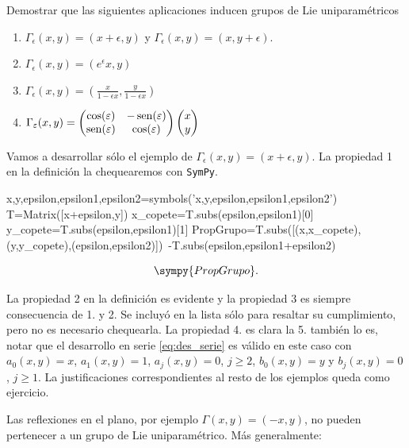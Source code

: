 \begin{ejemplo}{} Demostrar que las siguientes aplicaciones inducen grupos de Lie uniparamétricos
\begin{enumerate}
\item $\Gamma_{\epsilon}(x,y)=(x+\epsilon,y)$ y $\Gamma_{\epsilon}(x,y)=(x,y+\epsilon)$.
\item $\Gamma_{\epsilon}(x,y)=(e^{\epsilon}x,y)$
\item$\Gamma_{\epsilon}(x,y)=\left(\frac{x}{1-\epsilon x},\frac{y}{1-\epsilon x} \right)$
\item$\Gamma_{\varepsilon}(x,y)=\begin{pmatrix} \cos(\varepsilon) & -\operatorname{sen}(\varepsilon)
\\ \operatorname{sen}(\varepsilon) & \cos(\varepsilon)
\end{pmatrix} \begin{pmatrix} x\\ y
\end{pmatrix}
$
\end{enumerate}
\end{ejemplo}

Vamos a desarrollar sólo el ejemplo de $\Gamma_{\epsilon}(x,y)=(x+\epsilon,y)$. La propiedad 1 en la definición la chequearemos con  \texttt{SymPy}. 

\begin{sympyblock}[][frame=single]
x,y,epsilon,epsilon1,epsilon2=symbols('x,y,epsilon,epsilon1,epsilon2')
T=Matrix([x+epsilon,y])
x_copete=T.subs(epsilon,epsilon1)[0]
y_copete=T.subs(epsilon,epsilon1)[1]
PropGrupo=T.subs([(x,x_copete),(y,y_copete),(epsilon,epsilon2)])\
-T.subs(epsilon,epsilon1+epsilon2)
\end{sympyblock}

\[\sympy{PropGrupo}.\]


 La propiedad 2 en la definición es evidente y la propiedad 3 es siempre consecuencia de 1. y 2. 
Se incluyó en la lista sólo para resaltar su cumplimiento, pero no es necesario chequearla. La propiedad 4. es clara la 5. también lo es, notar que el desarrollo en serie \eqref{eq:des_serie} es válido en este caso con $a_0(x,y)=x$, $a_1(x,y)=1$, $a_j(x,y)=0$, $j\geq 2$, $b_0(x,y)=y$ y $b_j(x,y)=0$, $j\geq 1$. La justificaciones correspondientes al resto de los ejemplos queda como ejercicio.


 Las reflexiones en el plano, por ejemplo $\Gamma(x,y)=(-x,y)$,  no pueden  pertenecer a un  grupo de Lie uniparamétrico. Más generalmente:
 
